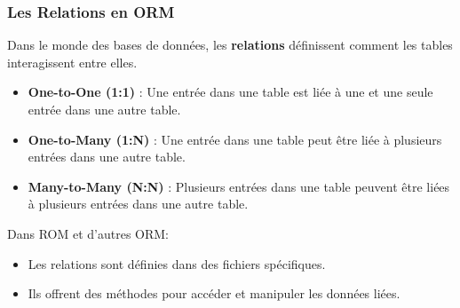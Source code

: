 \begin{frame}
  \frametitle{Les Relations en ORM}

  Dans le monde des bases de données, les \textbf{relations} définissent comment les tables interagissent entre elles.

  \begin{itemize}
    \item \textbf{One-to-One (1:1)} : Une entrée dans une table est liée à une et une seule entrée dans une autre table.
    \item \textbf{One-to-Many (1:N)} : Une entrée dans une table peut être liée à plusieurs entrées dans une autre table.
    \item \textbf{Many-to-Many (N:N)} : Plusieurs entrées dans une table peuvent être liées à plusieurs entrées dans une autre table.
  \end{itemize}

  Dans ROM et d'autres ORM:
  \begin{itemize}
    \item Les relations sont définies dans des fichiers spécifiques.
    \item Ils offrent des méthodes pour accéder et manipuler les données liées.
  \end{itemize}

\end{frame}

